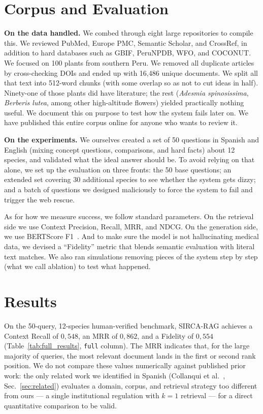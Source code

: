 \documentclass[runningheads]{llncs}
\newcommand{\sirca}{\textsc{SIRCA-RAG}}
\begin{document}
\section{Corpus and Evaluation}
\label{sec:experiments}

\textbf{On the data handled.} We combed through eight large repositories to compile this. We reviewed PubMed, Europe PMC, Semantic Scholar, and CrossRef, in addition to hard databases such as GBIF, PeruNPDB, WFO, and COCONUT. We focused on 100 plants from southern Peru. We removed all duplicate articles by cross-checking DOIs and ended up with 16{,}486 unique documents. We split all that text into 512-word chunks (with some overlap so as not to cut ideas in half). Ninety-one of those plants did have literature; the rest (\textit{Adesmia spinosissima}, \textit{Berberis lutea}, among other high-altitude flowers) yielded practically nothing useful. We document this on purpose to test how the system fails later on. We have published this entire corpus online for anyone who wants to review it.

\textbf{On the experiments.} We ourselves created a set of 50 questions in Spanish and English (mixing concept questions, comparisons, and hard facts) about 12 species, and validated what the ideal answer should be. To avoid relying on that alone, we set up the evaluation on three fronts: the 50 base questions; an extended set covering 30 additional species to see whether the system gets dizzy; and a batch of questions we designed maliciously to force the system to fail and trigger the web rescue.

As for how we measure success, we follow standard parameters. On the retrieval side we use Context Precision, Recall, MRR, and NDCG. On the generation side, we use BERTScore F1~\cite{zhang2020bertscore}. And to make sure the model is not hallucinating medical data, we devised a ``Fidelity'' metric that blends semantic evaluation with literal text matches. We also ran simulations removing pieces of the system step by step (what we call ablation) to test what happened.

\section{Results}
\label{sec:results}

On the 50-query, 12-species human-verified benchmark, \sirca{} achieves a Context Recall of $0{,}548$, an MRR of $0{,}862$, and a Fidelity of $0{,}554$ (Table~\ref{tab:full_results}, \texttt{full} column). The MRR indicates that, for the large majority of queries, the most relevant document lands in the first or second rank position. We do not compare these values numerically against published prior work: the only related work we identified in Spanish (Collanqui et al.~\cite{collanqui2026cagrag}, Sec.~\ref{sec:related}) evaluates a domain, corpus, and retrieval strategy too different from ours — a single institutional regulation with $k{=}1$ retrieval — for a direct quantitative comparison to be valid.
\end{document}
